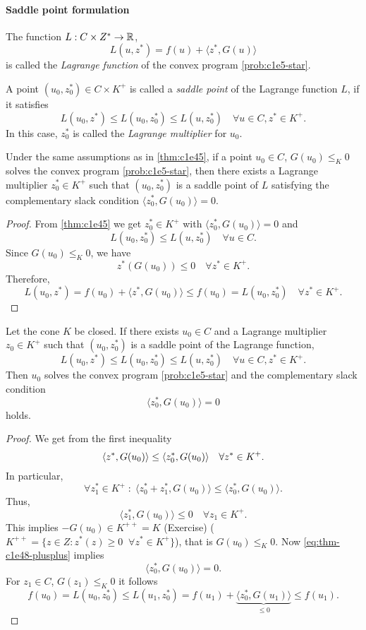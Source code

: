 \documentclass[../skript.tex]{subfiles}
\begin{document}
\paragraph{Saddle point formulation}
\begin{definition} %
\label{def:c1e46}
The function $L : C \times Z^* \to \mathbb{R}$,
\[
	L(u, z^*) = f(u) + \langle z^*, G(u) \rangle
\]
is called the \emph{Lagrange function} of the convex program \cref{prob:c1e5-star}.

A point $(u_0, z_0^*) \in C \times K^+$ is called a \emph{saddle point} of the Lagrange function $L$, if it satisfies
\[
	L(u_0, z^*) \leq L(u_0, z_0^*) \leq L(u, z_0^*) \quad \forall u \in C, z^* \in K^+.
\]
In this case, $z_0^*$ is called the \emph{Lagrange multiplier} for $u_0$.
\end{definition}
\begin{theorem} %
\label{thm:c1e47}
Under the same assumptions as in \cref{thm:c1e45}, if a point $u_0 \in C$, $G(u_0) \leq_K 0$ solves the convex program \cref{prob:c1e5-star}, then there exists a Lagrange multiplier $z_0^* \in K^+$ such that $(u_0, z_0^*)$ is a saddle point of $L$ satisfying the complementary slack condition $\langle z_0^*, G(u_0) \rangle = 0$.
\end{theorem}
\begin{proof}
From \cref{thm:c1e45} we get $z_0^* \in K^+$ with $\langle z_0^*, G(u_0) \rangle = 0$ and
\[
	L(u_0, z_0^*) \leq L(u, z_0^*) \quad \forall u \in C.
\]
Since $G(u_0) \leq_K 0$, we have 
\[
	z^*(G(u_0)) \leq 0 \quad \forall z^* \in K^+.
\]
Therefore,
\[
	L(u_0, z^*) = f(u_0) + \langle z^*, G(u_0) \rangle \leq f(u_0) = L(u_0, z_0^*) \quad \forall z^* \in K^+.
\]
\end{proof}
\begin{theorem} %
\label{thm:c1e48}
Let the cone $K$ be closed. If there exists $u_0 \in C$ and a Lagrange multiplier $z_0 \in K^+$ such that $(u_0, z_0^*)$ is a saddle point of the Lagrange function,
\[
	L(u_0, z^*) \leq L(u_0, z_0^*) \leq L(u, z_0^*) \quad \forall u \in C, z^* \in K^+.
\]
Then $u_0$ solves the convex program \cref{prob:c1e5-star} and the complementary slack condition
\[
	\langle z^*_0, G(u_0) \rangle = 0
\]
holds.
\end{theorem}
\begin{proof}
We get from the first inequality
\begin{equation}
\opttag{++}
\label{eq:thm-c1e48-plusplus}
\langle z^*, G(u_0) \rangle \leq \langle z_0^*, G(u_0) \rangle \quad \forall z^* \in K^+.
\end{equation}
In particular,
\[
	\forall z_1^* \in K^+ \; : \; \langle z_0^* + z_1^*, G(u_0) \rangle \leq \langle z_0^*, G(u_0) \rangle.
\]
Thus,
\[
	\langle z_1^*, G(u_0) \rangle \leq 0 \quad \forall z_1 \in K^+.
\]
This implies $-G(u_0) \in K^{++} = K$ (Exercise) ($K^{++} = \{ z \in Z : z^*(z) \geq 0 \;\; \forall z^* \in K^+\}$),
that is $G(u_0) \leq_K 0$. Now \cref{eq:thm-c1e48-plusplus} implies
\[
	\langle z_0^*, G(u_0) \rangle = 0.
\]
For $z_1 \in C$, $G(z_1) \leq_K 0$ it follows
\[
	f(u_0) = L(u_0, z_0^*) \leq L(u_1, z_0^*) = f(u_1) + \underbrace{ \langle z_0^*, G(u_1) \rangle }_{\leq 0} \leq f(u_1).
\]
\end{proof}
\end{document}
